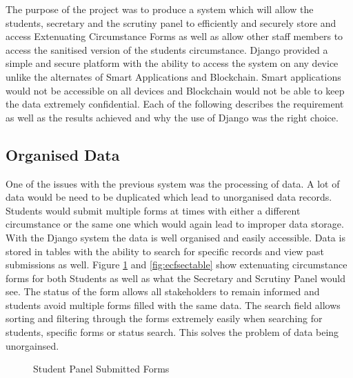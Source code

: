 \documentclass[../main.tex]{subfiles}
\begin{document}
\raggedright
The purpose of the project was to produce a system which will allow the students, secretary and the scrutiny panel to efficiently and securely store and access Extenuating Circumstance Forms as well as allow other staff members to access the sanitised version of the students circumstance. Django provided a simple and secure platform with the ability to access the system on any device unlike the alternates of Smart Applications and Blockchain. Smart applications would not be accessible on all devices and Blockchain would not be able to keep the data extremely confidential. Each of the following describes the requirement as well as the results achieved and why the use of Django was the right choice. 
     
\subsection*{Organised Data}
One of the issues with the previous system was the processing of data. A lot of data would be need to be duplicated which lead to unorganised data records. Students would submit multiple forms at times with either a different circumstance or the same one which would again lead to improper data storage. With the Django system the data is well organised and easily accessible. Data is stored in tables with the ability to search for specific records and view past submissions as well.  Figure \ref{fig:ecfstudenttable} and \ref{fig:ecfsectable} show extenuating circumstance forms for both Students as well as what the Secretary and Scrutiny Panel would see. The status of the form allows all stakeholders to remain informed and students avoid multiple forms filled with the same data. The search field allows sorting and filtering through the forms extremely easily when searching for students, specific forms or status search. This solves the problem of data being unorgainsed. 

\begin{figure}[H]
        \caption{\label{fig:ecfstudenttable} Student Panel Submitted Forms}
      \end{figure}
 
\end{document}
